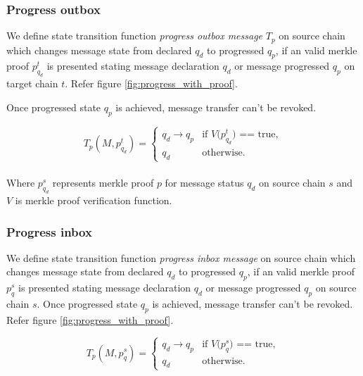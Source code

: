 \documentclass[12pt,a4paper]{article}
\begin{document}
\subsubsection{Progress outbox}\label{gateway:progressoutbox}

We define state transition function \emph{progress outbox message} $T_p$ on source chain which changes message state from declared $q_d$ to progressed $q_p$, if an valid merkle proof $p^t_{q_d}$ is presented stating message declaration $q_d$ or message progressed $q_p$ on target chain $t$. 
Refer figure \ref{fig:progress_with_proof}. 

Once progressed state $q_p$ is achieved, message transfer can’t be revoked. 

\begin{equation*}
T_p(M,p^t_{q_d})=\begin{cases}
q_d \rightarrow q_p & \text{if $V$($p^t_{q_d}$) == true},\\
q_d& \text{otherwise}.
\end{cases}
\end{equation*}
\begin{align*}
\end{align*}

Where $p^s_{q_d}$ represents merkle proof $p$ for message status $q_d$ on source chain $s$ and $V$ is merkle proof verification function.

\subsubsection{Progress inbox}\label{gateway:progressinbox}

We define state transition function \emph{progress inbox message} on source chain which changes message state from declared $q_d$ to progressed $q_p$, if an valid merkle proof $p^s_{q}$ is presented stating message declaration $q_d$ or message progressed $q_p$ on source chain $s$.
 Once progressed state $q_p$ is achieved, message transfer can’t be revoked. Refer figure \ref{fig:progress_with_proof}. 

\begin{equation*}
T_p(M,p^s_{q})=\begin{cases}
q_d \rightarrow q_p & \text{if $V$($p^s_{q}$) == true},\\
q_d& \text{otherwise}.
\end{cases}
\end{equation*}
\begin{align*}
\end{align*}
\end{document}

